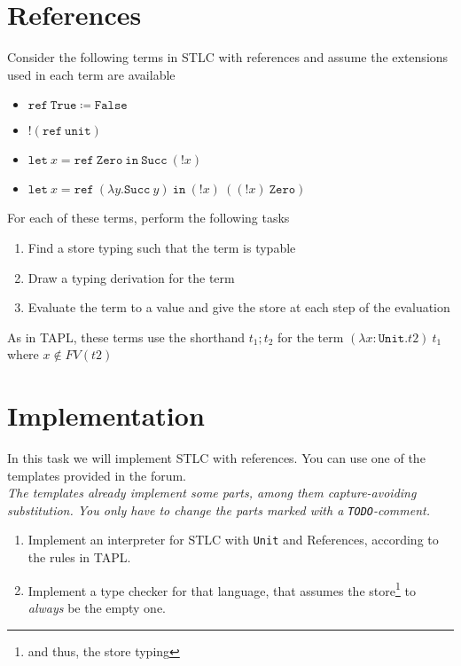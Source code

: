 \section{References}
Consider the following terms in STLC with references and assume the extensions used in each term are available 
\begin{itemize}
  \item $\mathtt{ref}\ \mathtt{True} \coloneq \mathtt{False}$
  \item $!(\mathtt{ref}\ \mathtt{unit})$
  \item $\mathtt{let}\ x = \mathtt{ref}\ \mathtt{Zero}\ \mathtt{in}\ \mathtt{Succ}\ (!x)$
  \item $\mathtt{let}\ x = \mathtt{ref}\ (\lambda y.\mathtt{Succ}\ y)\ \mathtt{in}\ (!x)\ ((!x)\ \mathtt{Zero})$
\end{itemize}

For each of these terms, perform the following tasks
\begin{enumerate}
  \item Find a store typing such that the term is typable 
  \item Draw a typing derivation for the term
  \item Evaluate the term to a value and give the store at each step of the evaluation
\end{enumerate}

As in TAPL, these terms use the shorthand $t_1;t_2$ for the term $(\lambda x:\mathtt{Unit}.t2)\ t_1$ where $x\notin FV(t2)$

\section{Implementation}
In this task we will implement STLC with references.
You can use one of the templates provided in the forum.\\
\emph{
    The templates already implement some parts, among them capture-avoiding substitution.
    You only have to change the parts marked with a \texttt{TODO}-comment.
}

\begin{enumerate}
  \item Implement an interpreter for STLC with {\texttt{Unit}} and References, according to the rules in TAPL.
  \item Implement a type checker for that language,
    that assumes the store\footnote{and thus, the store typing} to \emph{always} be the empty one.
\end{enumerate}
